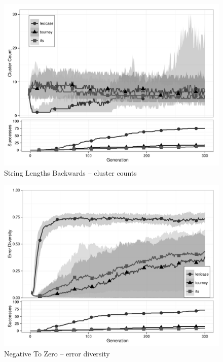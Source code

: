 \begin{figure}[p] %
\centering
\includegraphics[width=11.5cm]{string-lengths-backwards-cluster.pdf}
\caption{String Lengths Backwards -- cluster counts}
\label{string-lengths-backwardsClu}
\end{figure}

\begin{figure}[p] %
\centering
\includegraphics[width=11.5cm]{negative-to-zero-diversity.pdf}
\caption{Negative To Zero -- error diversity}
\label{negative-to-zeroDiv}
\end{figure}

